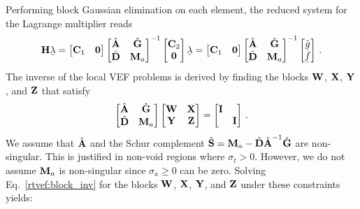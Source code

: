 \documentclass[../doc.tex]{subfiles}
\begin{document}
Performing block Gaussian elimination on each element, the reduced system for the Lagrange multiplier reads 
	\begin{equation}
		\mat{H} \fevec{\lambda} = 
		\begin{bmatrix} 
			\mat{C}_1 & \mat{0} 
		\end{bmatrix}
		\begin{bmatrix} 
			\hmat{A} & \hmat{G} \\ \hmat{D} & \mat{M}_a 
		\end{bmatrix}^{-1}
		\begin{bmatrix} 
			\mat{C}_2 \\ \mat{0}
		\end{bmatrix}
		\fevec{\lambda}
		= \begin{bmatrix} 
			\mat{C}_1 & \mat{0} 
		\end{bmatrix}
		\begin{bmatrix} 
			\hmat{A} & \hmat{G} \\ \hmat{D} & \mat{M}_a 
		\end{bmatrix}^{-1}
		\begin{bmatrix} 
			\hat{\fevec{g}} \\ \fevec{f} 
		\end{bmatrix} \,. 
	\end{equation}
The inverse of the local VEF problems is derived by finding the blocks $\boldsymbol{\mathrm{W}}$, $\boldsymbol{\mathrm{X}}$, $\boldsymbol{\mathrm{Y}}$, and $\boldsymbol{\mathrm{Z}}$ that satisfy
	\begin{equation} \label{rtvef:block_inv}
		\begin{bmatrix} 
			\hat{\boldsymbol{\mathrm{A}}} & \hat{\boldsymbol{\mathrm{G}}} \\ \hat{\boldsymbol{\mathrm{D}}} & \boldsymbol{\mathrm{M}}_a 
		\end{bmatrix}
		\begin{bmatrix} 
			\boldsymbol{\mathrm{W}} & \boldsymbol{\mathrm{X}} \\ \boldsymbol{\mathrm{Y}} & \boldsymbol{\mathrm{Z}} 
		\end{bmatrix}
		= \begin{bmatrix} 
			\boldsymbol{\mathrm{I}} \\
			& \boldsymbol{\mathrm{I}} 
		\end{bmatrix} \,. 
	\end{equation}
We assume that $\hat{\boldsymbol{\mathrm{A}}}$ and the Schur complement $\hat{\boldsymbol{\mathrm{S}}} = \boldsymbol{\mathrm{M}}_a - \hat{\boldsymbol{\mathrm{D}}} \hat{\boldsymbol{\mathrm{A}}}^{-1}\hat{\boldsymbol{\mathrm{G}}}$ are non-singular. This is justified in non-void regions where $\sigma_t > 0$. However, we do not assume $\boldsymbol{\mathrm{M}}_a$ is non-singular since $\sigma_a \geq 0$ can be zero. 
Solving Eq.~\ref{rtvef:block_inv} for the blocks $\boldsymbol{\mathrm{W}}$, $\boldsymbol{\mathrm{X}}$, $\boldsymbol{\mathrm{Y}}$, and $\boldsymbol{\mathrm{Z}}$ under these constraints yields: 
\end{document}
